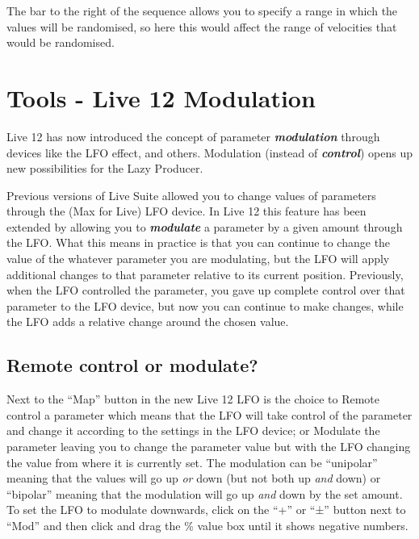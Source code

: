 \documentclass[
  12pt,
  letterpaper,
  oneside,
  open=any]{scrbook}
\begin{document}
The bar to the right of the sequence allows you to specify a range in
which the values will be randomised, so here this would affect the range
of velocities that would be randomised.


\chapter{Tools - Live 12
Modulation}\label{Chapter-032-Tools-Live12_Modulation}

Live 12 has now introduced the concept of parameter
\textbf{\emph{modulation}} through devices like the LFO effect, and
others. Modulation (instead of \textbf{\emph{control}}) opens up new
possibilities for the Lazy Producer.

\begin{tcolorbox}[enhanced jigsaw, opacitybacktitle=0.6, rightrule=.15mm, leftrule=.75mm, opacityback=0, toptitle=1mm, toprule=.15mm, breakable, titlerule=0mm, colback=white, bottomtitle=1mm, title=\textcolor{quarto-callout-tip-color}{\faLightbulb}\hspace{0.5em}{Key idea}, coltitle=black, left=2mm, colframe=quarto-callout-tip-color-frame, bottomrule=.15mm, colbacktitle=quarto-callout-tip-color!10!white, arc=.35mm]

Previous versions of Live Suite allowed you to change values of
parameters through the (Max for Live) LFO device. In Live 12 this
feature has been extended by allowing you to \textbf{\emph{modulate}} a
parameter by a given amount through the LFO. What this means in practice
is that you can continue to change the value of the whatever parameter
you are modulating, but the LFO will apply additional changes to that
parameter relative to its current position. Previously, when the LFO
controlled the parameter, you gave up complete control over that
parameter to the LFO device, but now you can continue to make changes,
while the LFO adds a relative change around the chosen value.

\end{tcolorbox}

\section{Remote control or modulate?}\label{remote-control-or-modulate}

Next to the ``Map'' button in the new Live 12 LFO is the choice to
Remote control a parameter which means that the LFO will take control of
the parameter and change it according to the settings in the LFO device;
or Modulate the parameter leaving you to change the parameter value but
with the LFO changing the value from where it is currently set. The
modulation can be ``unipolar'' meaning that the values will go up
\emph{or} down (but not both up \emph{and} down) or ``bipolar'' meaning
that the modulation will go up \emph{and} down by the set amount. To set
the LFO to modulate downwards, click on the ``+'' or ``±'' button next
to ``Mod'' and then click and drag the \% value box until it shows
negative numbers.
\end{document}
